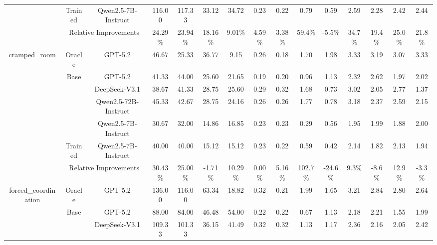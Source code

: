 \documentclass{article}
\theoremstyle{plain}
\theoremstyle{definition}
\theoremstyle{remark}
\begin{document}
\begin{table}[htbp]
{\begin{tabular}{c|c|r|cccccc|cccccc}
  \cmidrule{2-15}          & Trained & \multicolumn{1}{c|}{Qwen2.5-7B-Instruct} & 116.00  & 117.33  & 33.12  & 34.72  & 0.23  & 0.22  & 0.79  & 0.59  & 2.59  & 2.28  & 2.42  & 2.44  \\
  \cmidrule{2-15}          & \multicolumn{2}{c|}{Relative Improvements} & 24.29\% & 23.94\% & 18.16\% & 9.01\% & 4.59\% & 3.38\% & 59.4\% & -5.5\% & 34.7\% & 19.4\% & 25.0\% & 21.8\% \\
      \midrule
      \multirow{7}[8]{*}{cramped\_room} & Oracle & \multicolumn{1}{c|}{GPT-5.2} & 46.67  & 25.33  & 36.77  & 9.15  & 0.26  & 0.18  & 1.70  & 1.98  & 3.33  & 3.19  & 3.07  & 3.33  \\
  \cmidrule{2-15}          & \multirow{4}[2]{*}{Base} & \multicolumn{1}{c|}{GPT-5.2} & 41.33  & 44.00  & 25.60  & 21.65  & 0.19  & 0.20  & 0.96  & 1.13  & 2.32  & 2.62  & 1.97  & 2.02  \\
            &       & \multicolumn{1}{c|}{DeepSeek-V3.1} & 38.67  & 41.33  & 28.75  & 25.60  & 0.29  & 0.32  & 1.68  & 0.73  & 3.02  & 2.05  & 2.77  & 1.37  \\
            &       & \multicolumn{1}{c|}{Qwen2.5-72B-Instruct} & 45.33  & 42.67  & 28.75  & 24.16  & 0.26  & 0.26  & 1.77  & 0.78  & 3.18  & 2.37  & 2.59  & 2.15  \\
            &       & \multicolumn{1}{c|}{Qwen2.5-7B-Instruct} & 30.67  & 32.00  & 14.86  & 16.85  & 0.23  & 0.23  & 0.29  & 0.56  & 1.95  & 1.99  & 1.88  & 2.00  \\
  \cmidrule{2-15}          & Trained & \multicolumn{1}{c|}{Qwen2.5-7B-Instruct} & 40.00  & 40.00  & 15.12  & 15.12  & 0.23  & 0.22  & 0.59  & 0.42  & 2.14  & 1.82  & 2.13  & 1.94  \\
  \cmidrule{2-15}          & \multicolumn{2}{c|}{Relative Improvements} & 30.43\% & 25.00\% & -1.71\% & 10.29\% & 0.00\% & 5.16\% & 102.7\% & -24.6\% & 9.3\% & -8.6\% & 12.9\% & -3.3\% \\
      \midrule
      \multirow{7}[8]{*}{forced\_coordination} & Oracle & \multicolumn{1}{c|}{GPT-5.2} & 136.00  & 116.00  & 63.34  & 18.82  & 0.32  & 0.21  & 1.99  & 1.65  & 3.21  & 2.84  & 2.80  & 2.64  \\
  \cmidrule{2-15}          & \multirow{4}[2]{*}{Base} & \multicolumn{1}{c|}{GPT-5.2} & 88.00  & 84.00  & 46.48  & 54.00  & 0.22  & 0.22  & 0.67  & 1.13  & 2.18  & 2.21  & 1.55  & 1.99  \\
            &       & \multicolumn{1}{c|}{DeepSeek-V3.1} & 109.33  & 101.33  & 36.15  & 41.49  & 0.32  & 0.32  & 1.13  & 1.17  & 2.36  & 2.16  & 2.05  & 2.42  \\

\end{tabular}}
\end{table}
\end{document}
